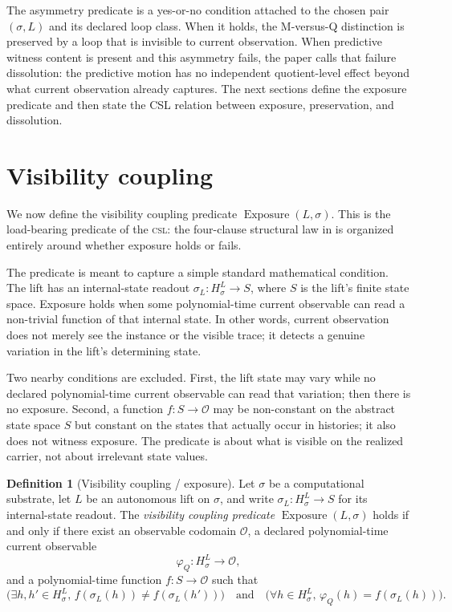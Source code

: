 \documentclass[11pt]{article}
\newcommand{\CSL}{\textsc{csl}}            \newcommand{\CSLcore}{Candidate Structural Law}
\newcommand{\Substrate}{\sigma}             \newcommand{\Lift}{L}                       \newcommand{\LiftState}{\sigma_{L}}         \newcommand{\HistorySpace}{H_{\Substrate}^{\Lift}}
\newcommand{\CurrentObservable}{\varphi_{Q}}    \newcommand{\Exposure}{\operatorname{Exposure}}
\theoremstyle{definition}
\newtheorem{definition}[theorem]{Definition}
\begin{document}
The asymmetry predicate is a yes-or-no condition attached to the
chosen pair \((\Substrate,\Lift)\) and its declared loop class.  When
it holds, the M-versus-Q distinction is preserved by a loop that is
invisible to current observation.  When predictive witness content is
present and this asymmetry fails, the paper calls that failure
dissolution: the predictive motion has no independent quotient-level
effect beyond what current observation already captures.  The next
sections define the exposure predicate and then state the CSL relation
between exposure, preservation, and dissolution.
 

\section{Visibility coupling}
\label{sec:visibility-coupling}

We now define the visibility coupling predicate
\(\Exposure(\Lift,\Substrate)\).  This is the load-bearing predicate
of the \CSL{}: the four-clause structural law in
 is organized entirely around whether exposure
holds or fails.

The predicate is meant to capture a simple standard mathematical
condition.  The lift has an internal-state readout
\(\LiftState:\HistorySpace\to S\), where \(S\) is the lift's finite
state space.  Exposure holds when some polynomial-time current
observable can read a non-trivial function of that internal state.  In
other words, current observation does not merely see the instance or
the visible trace; it detects a genuine variation in the lift's
determining state.

Two nearby conditions are excluded.  First, the lift state
may vary while no declared polynomial-time current observable can read
that variation; then there is no exposure.  Second, a function
\(f:S\to\mathcal O\) may be non-constant on the abstract state space
\(S\) but constant on the states that actually occur in histories; it
also does not witness exposure.  The predicate is about what is visible
on the realized carrier, not about irrelevant state values.

\begin{definition}[Visibility coupling / exposure]
\label{def:visibility-coupling}
Let \(\Substrate\) be a computational substrate, let \(\Lift\) be an
autonomous lift on \(\Substrate\), and write
\(\LiftState:\HistorySpace\to S\) for its internal-state readout.
The \emph{visibility coupling predicate}
\(\Exposure(\Lift,\Substrate)\) holds if and only if there exist an
observable codomain \(\mathcal O\), a declared polynomial-time current
observable
\[
  \CurrentObservable:\HistorySpace\to\mathcal O,
\]
and a polynomial-time function \(f:S\to\mathcal O\) such that
\[
  \bigl(\exists h,h'\in\HistorySpace,\,
      f(\LiftState(h))\neq f(\LiftState(h'))\bigr)
  \quad\text{and}\quad
  \bigl(\forall h\in\HistorySpace,\,
      \CurrentObservable(h)=f(\LiftState(h))\bigr).
\]
\end{definition}
\end{document}
